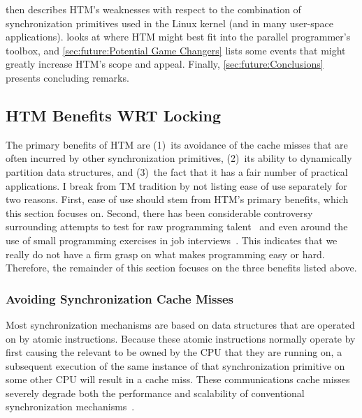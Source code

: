  then describes
HTM's weaknesses with respect to the combination of synchronization
primitives used in the Linux kernel (and in many user-space applications).
 looks at where HTM
might best fit into the parallel programmer's toolbox, and
\cref{sec:future:Potential Game Changers} lists some events that might
greatly increase HTM's scope and appeal.
Finally, \cref{sec:future:Conclusions}
presents concluding remarks.

\subsection{HTM Benefits WRT Locking}
\label{sec:future:HTM Benefits WRT Locking}

The primary benefits of HTM are
(1)~its avoidance of the cache misses that are often incurred by
other synchronization primitives,
(2)~its ability to dynamically partition
data structures,
and (3)~the fact that it has
a fair number of practical applications.
I break from TM tradition by not listing ease of use separately
for two reasons.
First, ease of use should stem from HTM's primary benefits,
which this section focuses on.
Second, there has been considerable controversy surrounding attempts to
test for raw programming
talent~\cite{RichardBornat2006SheepGoats,SaeedDehnadi2009SheepGoats,ElizabethPatitsas2020GradesNotBimodal}
and even around the use of small programming exercises in job
interviews~\cite{RegBraithwaite2007FizzBuzz}.
This indicates that we really do not have a firm grasp on what makes
programming easy or hard.
Therefore, the remainder of this section focuses on the three benefits
listed above.

\subsubsection{Avoiding Synchronization Cache Misses}
\label{sec:future:Avoiding Synchronization Cache Misses}

Most synchronization mechanisms are based on data structures that are
operated on by atomic instructions.
Because these atomic instructions normally operate by first causing
the relevant  to be owned by the CPU that they are running on,
a subsequent execution
of the same instance of that synchronization primitive on some other
CPU will result in a cache miss.
These communications cache misses severely degrade both the performance and
scalability of conventional synchronization
mechanisms~\cite[Section 4.2.3]{Anderson97}.

